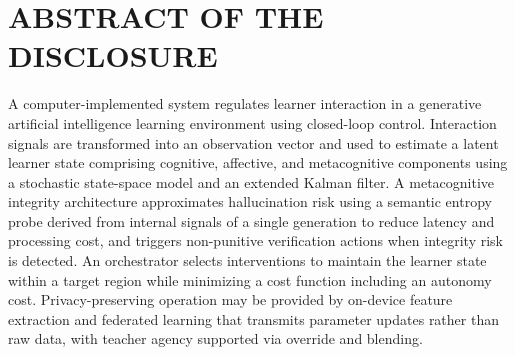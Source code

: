 \documentclass[12pt]{article}
\newcounter{para}
\begin{document}
\newpage
\section*{ABSTRACT OF THE DISCLOSURE}
\noindent
A computer-implemented system regulates learner interaction in a generative artificial intelligence learning environment using closed-loop control. Interaction signals are transformed into an observation vector and used to estimate a latent learner state comprising cognitive, affective, and metacognitive components using a stochastic state-space model and an extended Kalman filter. A metacognitive integrity architecture approximates hallucination risk using a semantic entropy probe derived from internal signals of a single generation to reduce latency and processing cost, and triggers non-punitive verification actions when integrity risk is detected. An orchestrator selects interventions to maintain the learner state within a target region while minimizing a cost function including an autonomy cost. Privacy-preserving operation may be provided by on-device feature extraction and federated learning that transmits parameter updates rather than raw data, with teacher agency supported via override and blending.
\end{document}
